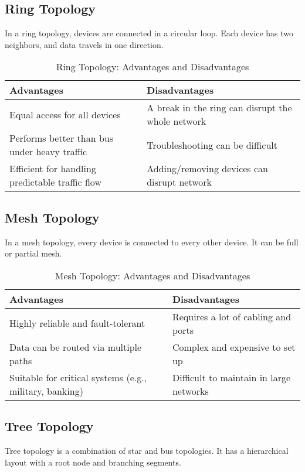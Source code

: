 \subsection{Ring Topology}
In a ring topology, devices are connected in a circular loop. Each device has two neighbors, and data travels in one direction.

\begin{table}[H]
\centering
\caption{Ring Topology: Advantages and Disadvantages}
\begin{tabularx}{\linewidth}{|X|X|}
\hline
\textbf{Advantages} & \textbf{Disadvantages} \\
\hline
Equal access for all devices & A break in the ring can disrupt the whole network \\
\hline
Performs better than bus under heavy traffic & Troubleshooting can be difficult \\
\hline
Efficient for handling predictable traffic flow & Adding/removing devices can disrupt network \\
\hline
\end{tabularx}
\end{table}

\subsection{Mesh Topology}
In a mesh topology, every device is connected to every other device. It can be full or partial mesh.

\begin{table}[H]
\centering
\caption{Mesh Topology: Advantages and Disadvantages}
\begin{tabularx}{\linewidth}{|X|X|}
\hline
\textbf{Advantages} & \textbf{Disadvantages} \\
\hline
Highly reliable and fault-tolerant & Requires a lot of cabling and ports \\
\hline
Data can be routed via multiple paths & Complex and expensive to set up \\
\hline
Suitable for critical systems (e.g., military, banking) & Difficult to maintain in large networks \\
\hline
\end{tabularx}
\end{table}

\subsection{Tree Topology}
Tree topology is a combination of star and bus topologies. It has a hierarchical layout with a root node and branching segments.

